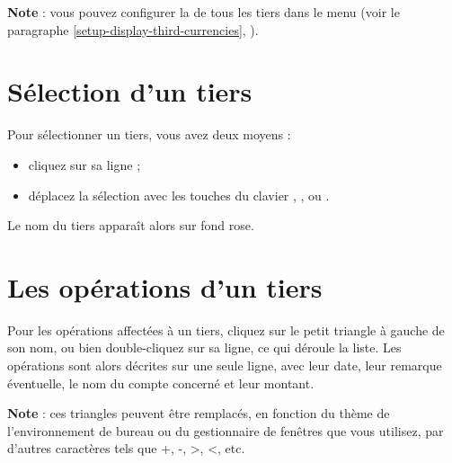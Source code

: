 
\textbf{Note} : vous pouvez configurer la  de tous les tiers dans le menu  (voir le paragraphe \vref{setup-display-third-currencies}, ).

\ifIllustration
\newpage
\fi


\section{Sélection d'un tiers\label{thirdparties-selection}}


Pour sélectionner un tiers, vous avez deux moyens :

\begin{itemize}
	 \item cliquez sur sa ligne ;
	 \item déplacez la sélection avec les touches du clavier , ,  ou .
\end{itemize}

Le nom du tiers apparaît alors sur fond rose{\couleur}.


\section{Les opérations d'un tiers\label{thirdparties-transactions}}


Pour  les opérations affectées à un tiers, cliquez sur le petit triangle à gauche de son nom, ou bien double-cliquez sur sa ligne,
ce qui déroule la liste. Les opérations sont alors décrites sur une seule ligne, avec leur date, leur remarque éventuelle, le nom du compte concerné et leur montant.

\textbf{Note} : ces triangles peuvent être remplacés, en fonction du thème de l'environnement de bureau ou du gestionnaire de fenêtres que vous utilisez, par d'autres caractères tels que +, -, >, <, etc.

